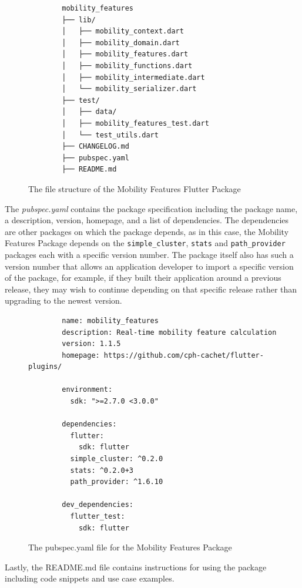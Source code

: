 \begin{figure}
    \centering
    \begin{verbatim}
        mobility_features
        ├── lib/
        │   ├── mobility_context.dart
        │   ├── mobility_domain.dart
        │   ├── mobility_features.dart
        │   ├── mobility_functions.dart
        │   ├── mobility_intermediate.dart
        │   └── mobility_serializer.dart
        ├── test/
        │   ├── data/
        │   ├── mobility_features_test.dart
        │   └── test_utils.dart
        ├── CHANGELOG.md
        ├── pubspec.yaml
        ├── README.md
    \end{verbatim}
    \caption{The file structure of the Mobility Features Flutter Package}
    \label{fig:package-structure}
\end{figure}

The \textit{pubspec.yaml} contains the package specification including the package name, a description, version, homepage, and a list of dependencies. The dependencies are other packages on which the package depends, as in this case, the Mobility Features Package depends on the \verb|simple_cluster|, \verb|stats| and \verb|path_provider| packages each with a specific version number. The package itself also has such a version number that allows an application developer to import a specific version of the package, for example, if they built their application around a previous release, they may wish to continue depending on that specific release rather than upgrading to the newest version.

\begin{figure}
    \centering
    \begin{verbatim}
        name: mobility_features
        description: Real-time mobility feature calculation
        version: 1.1.5
        homepage: https://github.com/cph-cachet/flutter-plugins/
        
        environment:
          sdk: ">=2.7.0 <3.0.0"
        
        dependencies:
          flutter:
            sdk: flutter
          simple_cluster: ^0.2.0
          stats: ^0.2.0+3
          path_provider: ^1.6.10
        
        dev_dependencies:
          flutter_test:
            sdk: flutter
    \end{verbatim}
    \caption{The pubspec.yaml file for the Mobility Features Package}
    \label{fig:pubspec}
\end{figure}

Lastly, the README.md file contains instructions for using the package including code snippets and use case examples. 

